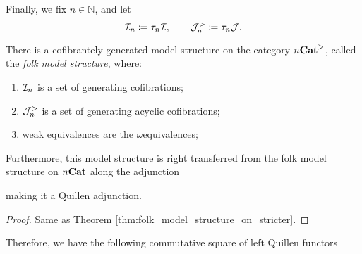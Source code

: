 \noindent Finally, we fix \( n \in \mathbb{N} \), and let
\begin{equation*}
    \mathcal{I}_n \coloneqq \tau_{n}\mathcal{I},\quad\quad \mathcal{J}^>_n \coloneqq \tau_{n}\mathcal{J}.
\end{equation*}

\begin{thm} \label{thm:folk_model_structure_on_stricter_n}
    There is a cofibrantely generated model structure on the category \( {n\mathbf{Cat}}^> \), called the \emph{folk model structure}, where:
    \begin{enumerate}
        \item \( \mathcal{I}_n \) is a set of generating cofibrations;
        \item \( \mathcal{J}^>_n \) is a set of generating acyclic cofibrations;
        \item weak equivalences are the \( \omega \)\nbd equivalences;
    \end{enumerate}
    Furthermore, this model structure is right transferred from the folk model structure on \( {n\mathbf{Cat}} \) along the adjunction 
    \begin{center}
    \end{center}
    making it a Quillen adjunction.
\end{thm}
\begin{proof}
    Same as Theorem \ref{thm:folk_model_structure_on_stricter}.
\end{proof}

\noindent Therefore, we have the following commutative square of left Quillen functors
\begin{center}
\end{center}

